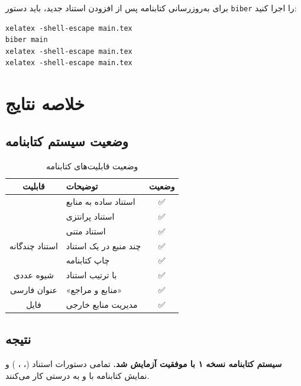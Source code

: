 \documentclass{matinbook}
\begin{document}
\begin{remark}
    برای به‌روزرسانی کتابنامه پس از افزودن استناد جدید،
    باید دستور \texttt{biber} را اجرا کنید:
    
    \begin{latin}
\begin{verbatim}
xelatex -shell-escape main.tex
biber main
xelatex -shell-escape main.tex
xelatex -shell-escape main.tex
\end{verbatim}
    \end{latin}
\end{remark}

\chapter{خلاصه نتایج}

\section{وضعیت سیستم کتابنامه}

\begin{table}[h]
\centering
\caption{وضعیت قابلیت‌های کتابنامه}
\label{tab:bibliography-status}
\begin{tabular}{|c|C{6cm}|c|}
\hline
\textbf{قابلیت} & \textbf{توضیحات} & \textbf{وضعیت} \\
\hline
{} & استناد ساده به منابع & \textcolor{matingreen}{✅} \\
 & استناد پرانتزی & \textcolor{matingreen}{✅} \\
 & استناد متنی & \textcolor{matingreen}{✅} \\
استناد چندگانه & چند منبع در یک استناد & \textcolor{matingreen}{✅} \\
 & چاپ کتابنامه & \textcolor{matingreen}{✅} \\
شیوه عددی &  با ترتیب استناد & \textcolor{matingreen}{✅} \\
عنوان فارسی & «منابع و مراجع» & \textcolor{matingreen}{✅} \\
فایل  & مدیریت منابع خارجی & \textcolor{matingreen}{✅} \\
\hline
\end{tabular}
\end{table}

\section{نتیجه}

\textbf{سیستم کتابنامه  نسخه ۱ با موفقیت آزمایش شد.}
تمامی دستورات استناد (، ، )
و نمایش کتابنامه با  و 
به درستی کار می‌کنند. 🎉
\end{document}
